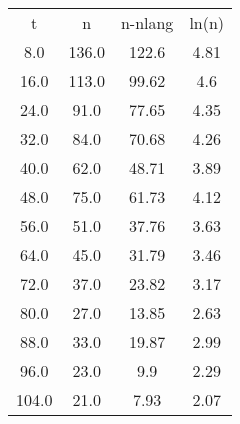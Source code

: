 \begin{table}
\begin{tabular}{cccc}
t & n & n-nlang & ln(n) \\
8.0 & 136.0 & 122.6 & 4.81 \\
16.0 & 113.0 & 99.62 & 4.6 \\
24.0 & 91.0 & 77.65 & 4.35 \\
32.0 & 84.0 & 70.68 & 4.26 \\
40.0 & 62.0 & 48.71 & 3.89 \\
48.0 & 75.0 & 61.73 & 4.12 \\
56.0 & 51.0 & 37.76 & 3.63 \\
64.0 & 45.0 & 31.79 & 3.46 \\
72.0 & 37.0 & 23.82 & 3.17 \\
80.0 & 27.0 & 13.85 & 2.63 \\
88.0 & 33.0 & 19.87 & 2.99 \\
96.0 & 23.0 & 9.9 & 2.29 \\
104.0 & 21.0 & 7.93 & 2.07 \\
\end{tabular}
\end{table}
